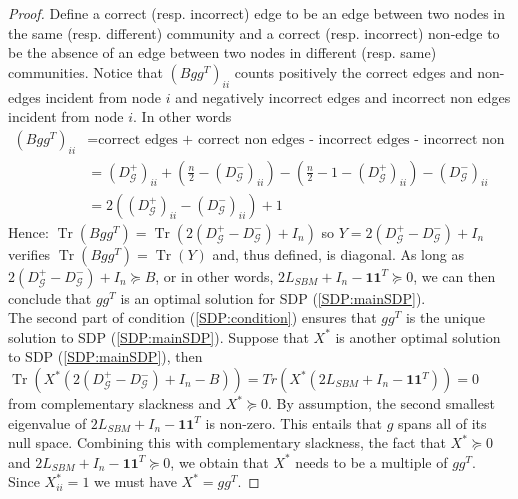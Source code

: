 \documentclass[english]{article}
\newcommand{\1}{\textbf{1}}
\newcommand{\Dp}{D_{\mathcal{G}}^+}
\newcommand{\Dm}{D_{\mathcal{G}}^-}
\newcommand{\tr}{\operatorname{Tr}}
\begin{document}
\begin{proof}
Define a correct (resp. incorrect) edge to be an edge between two nodes in the same (resp. different) community and a correct (resp. incorrect) non-edge to be the absence of an edge between two nodes in different (resp. same) communities. Notice that $(Bgg^T)_{ii}$ counts positively the correct edges and non-edges incident from node $i$ and negatively incorrect edges and incorrect non edges incident from node $i$. In other words
\begin{align}
(Bgg^T)_{ii} &= \text{correct edges + correct non edges - incorrect edges - incorrect non edges}\\
&= (\Dp)_{ii}+\left(\frac{n}{2}-(\Dm)_{ii}\right) - \left(\frac{n}{2}-1-(\Dp)_{ii}\right) - (\Dm)_{ii}\\
&=2\left((\Dp)_{ii}-(\Dm)_{ii}\right)+1
\end{align}
Hence: $\tr\left(Bgg^T\right)=\tr\left(2\left(\Dp-\Dm\right)+I_n\right)$ so $Y=2\left(\Dp-\Dm\right)+I_n$ verifies $\tr(Bgg^T)=\tr(Y)$ and, thus defined, is diagonal. As long as $2\left(\Dp-\Dm\right)+I_n \succeq B$, or in other words, $2L_{SBM} +I_n-\1\1^T \succeq 0$, we can then conclude that $gg^T$ is an optimal solution for SDP (\ref{SDP:mainSDP}). \\

The second part of condition (\ref{SDP:condition}) ensures that $gg^T$ is the unique solution to SDP (\ref{SDP:mainSDP}). Suppose that $X^*$ is another optimal solution to SDP (\ref{SDP:mainSDP}), then $\tr\left(X^*\left(2\left(\Dp-\Dm\right)+I_n-B\right)\right)=Tr \left( X^*\left(2L_{SBM} +I_n-\1\1^T\right)\right)=0$ from complementary slackness and $X^* \succeq 0$.  By assumption, the second smallest eigenvalue of  $2L_{SBM} +I_n-\1\1^T$ is non-zero. This entails that $g$ spans all of its null space. Combining this with complementary slackness, the fact that $X^* \succeq 0$ and $2L_{SBM} +I_n-\1\1^T \succeq 0$, we obtain that $X^*$ needs to be a multiple of $gg^T$. Since $X^*_{ii}=1$ we must have $X^*=gg^T$.
\end{proof}
\end{document}
